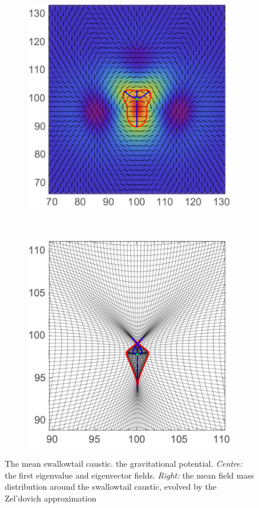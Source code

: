 \documentclass[a4paper, 11pt]{article}
\begin{document}
\begin{figure}
\begin{subfigure}[b]{0.32\textwidth}
\includegraphics[width=\textwidth]{Swallowtail_mean_L}
\end{subfigure}~
\begin{subfigure}[b]{0.32\textwidth}
\includegraphics[width=\textwidth]{Swallowtail_mean_Z}
\end{subfigure}
\caption{The mean swallowtail caustic.  the gravitational potential. \textit{Centre:} the first eigenvalue and eigenvector fields. \textit{Right:} the mean field mass distribution around the swallowtail caustic, evolved by the Zel'dovich approximation}\label{fig:meanSwallowtail}
\end{figure}
\end{document}
